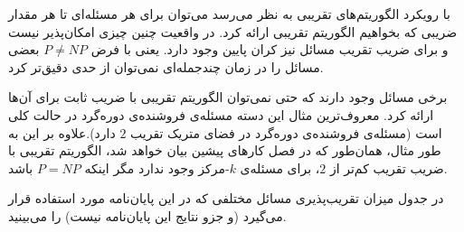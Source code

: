 
با رویکرد الگوریتم‌های تقریبی به نظر می‌رسد می‌توان برای هر مسئله‌ای تا هر مقدار ضریبی که بخواهیم الگوریتم تقریبی ارائه کرد. در واقعیت چنین چیزی امکان‌پذیر نیست و برای ضریب تقریب مسائل نیز کران پایین وجود دارد. یعنی با فرض $P \neq NP$ بعضی مسائل را در زمان چندجمله‌ای نمی‌توان از حدی دقیق‌تر کرد.

برخی مسائل وجود دارند که حتی نمی‌توان الگوریتم تقریبی با ضریب ثابت برای آن‌ها ارائه کرد. معروف‌ترین مثال این دسته مسئله‌ی فروشنده‌ی دوره‌گرد در حالت کلی است (مسئله‌ی فروشنده‌ی دوره‌گرد در فضای متریک تقریب $2$ دارد).علاوه بر این به طور مثال، همان‌طور که در فصل کارهای پیشین بیان خواهد شد، الگوریتم تقریبی با ضریب تقریب کم‌تر از $2$، برای مسئله‌ی $k$-مرکز وجود ندارد مگر اینکه $P = NP$ باشد.

در جدول   میزان تقریب‌پذیری مسائل مختلفی که در این پایان‌نامه مورد استفاده قرار می‌گیرد (و جزو نتایج این پایان‌نامه نیست) را می‌بینید.

